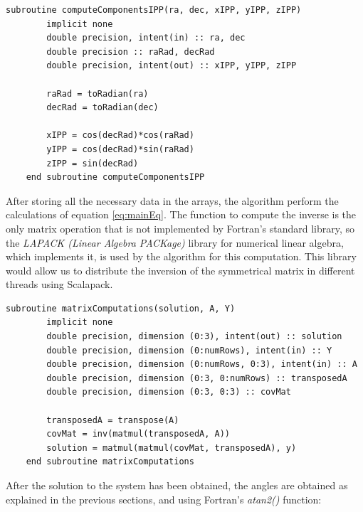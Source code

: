 \begin{minipage}{\linewidth}
	\label{lst:computeComponents}
	\begin{lstlisting}[style=myFortranStyle, caption=Compute the components of the IPP's unit vector]
	subroutine computeComponentsIPP(ra, dec, xIPP, yIPP, zIPP)
		implicit none
		double precision, intent(in) :: ra, dec
		double precision :: raRad, decRad
		double precision, intent(out) :: xIPP, yIPP, zIPP
		
		raRad = toRadian(ra)
		decRad = toRadian(dec)
		
		xIPP = cos(decRad)*cos(raRad)
		yIPP = cos(decRad)*sin(raRad)
		zIPP = sin(decRad)
	end subroutine computeComponentsIPP\end{lstlisting}
\end{minipage}

After storing all the necessary data in the arrays, the algorithm perform the calculations of equation \ref{eq:mainEq}. The function to compute the inverse is the only matrix operation that is not implemented by Fortran's standard library, so the \textit{LAPACK (Linear Algebra PACKage)} library for numerical linear algebra\cite{lapack}, which implements it, is used by the algorithm for this computation. This library would allow us to distribute the inversion of the symmetrical matrix in different threads using Scalapack.

\begin{minipage}{\linewidth}
	\label{lst:solveSystem}
	\begin{lstlisting}[style=myFortranStyle, caption=Function matrixComputations to solve the system]
	subroutine matrixComputations(solution, A, Y)
		implicit none
		double precision, dimension (0:3), intent(out) :: solution
		double precision, dimension (0:numRows), intent(in) :: Y
		double precision, dimension (0:numRows, 0:3), intent(in) :: A
		double precision, dimension (0:3, 0:numRows) :: transposedA
		double precision, dimension (0:3, 0:3) :: covMat
		
		transposedA = transpose(A)
		covMat = inv(matmul(transposedA, A))
		solution = matmul(matmul(covMat, transposedA), y)
	end subroutine matrixComputations\end{lstlisting}
\end{minipage}

After the solution to the system has been obtained, the angles are obtained as explained in the previous sections, and using Fortran's \textit{atan2()} function:

